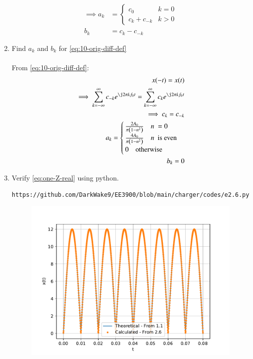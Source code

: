 \documentclass[journal,12pt,twocolumn]{IEEEtran}
\renewcommand\thesection{\arabic{section}}
\begin{document}
\begin{enumerate}[label=\thesection.\arabic*,ref=\thesection.\theenumi]
\begin{align}
	\implies
	a_k &= 
	\begin{cases}
		c_0 & k = 0 \\
		c_k + c_{-k} & k > 0
	\end{cases} \label{eq:ak} \\
	b_k &= c_k - c_{-k}
	\label{eq:bk}
\end{align}
\item Find $a_k$ and $b_k$ for 
\eqref{eq:10-orig-diff-def}\\
\solution\\
From \eqref{eq:10-orig-diff-def}:
\begin{align}
	x(-t) = x(t)\\
	\implies \sum_{k = -\infty}^{\infty}c_{-k}e^{\j2\pi kf_0t}
	= \sum_{k = -\infty}^{\infty}c_ke^{\j2\pi kf_0 t}\\
	\implies c_k = c_{-k}\\
	a_k = \begin{cases}
		\frac{2A_0}{\pi\brak{1-n^2}} \quad n\ = 0\\
		\frac{4A_0}{\pi\brak{1-n^2}} \quad n\ \text{ is even}\\
		0 \quad \text{otherwise}
	\end{cases}\\
	b_k = 0
\end{align}
\item Verify 
\eqref{eq:one-Z-real}
using python.
\begin{lstlisting}
https://github.com/DarkWake9/EE3900/blob/main/charger/codes/e2.6.py
\end{lstlisting}
\begin{figure}[!ht]
	\begin{center}
		\includegraphics[width=\columnwidth]{./figs/e2.6.pdf}
	\end{center}
	\label{fig:}	
\end{figure}



\end{enumerate}
\end{document}
